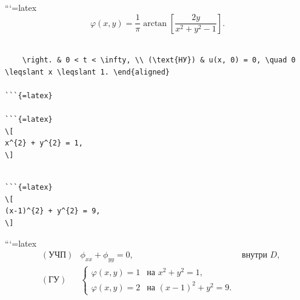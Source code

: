 \documentclass[
]{article}
\begin{document}
```{=latex}
\[
\varphi(x, y) = \frac{1}{\pi} \arctan\left[\frac{2y}{x^2 + y^2 - 1}\right].
\]

\begin{verbatim}

    \right. & 0 < t < \infty, \\ (\text{НУ}) & u(x, 0) = 0, \quad 0 \leqslant x \leqslant 1. \end{aligned}

```{=latex}

```{=latex}
\[
x^{2} + y^{2} = 1,
\]
\end{verbatim}

\begin{verbatim}

```{=latex}
\[
(x-1)^{2} + y^{2} = 9,
\]
\end{verbatim}

```{=latex}
\[
\begin{aligned} & (\text{УЧП}) & \phi_{xx} + \phi_{yy} = 0, & \text{внутри } D, \\ & (\text{ГУ}) & \begin{cases} \varphi(x, y) = 1 & \text{на } x^2 + y^2 = 1, \\ \varphi(x, y) = 2 & \text{на } (x - 1)^2 + y^2 = 9. \end{cases} \end{aligned}
\]
\end{document}
